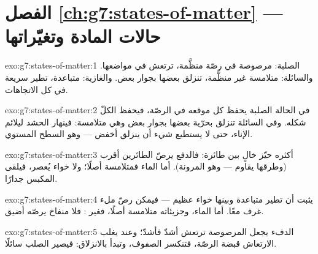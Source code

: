 \section*{الفصل \ref{ch:g7:states-of-matter} --- حالات المادة وتغيّراتها}

\begin{solution}{exo:g7:states-of-matter:1}
الصلبة:  مرصوصة في رصّة منظَّمة، ترتعش في مواضعها.
والسائلة:  متلامسة غير منظَّمة، تنزلق بعضها بجوار بعض.
والغازية:  متباعدة، تطير سريعة في كل الاتجاهات.
\end{solution}

\begin{solution}{exo:g7:states-of-matter:2}
في الحالة الصلبة يحفظ كل  موقعه في الرصّة، فيحفظ الكلّ
شكله. وفي السائلة تنزلق  بحرّية بعضها بجوار بعض وهي
متلامسة: فينهار الحشد ليلائم الإناء، حتى لا يستطيع شيء أن
ينزلق أخفض --- وهو السطح المستوي.
\end{solution}

\begin{solution}{exo:g7:states-of-matter:3}
 أكثره حيّز خالٍ بين  طائرة: فالدفع يرصّ الطائرين
أقرب (وطرقها يقاوم --- وهو المرونة). أما  الماء فمتلامسة
أصلًا؛ ولا خواء يُعصر، فيلقى المكبس جدارًا.
\end{solution}

\begin{solution}{exo:g7:states-of-matter:4}
يثبت أن   تطير متباعدة وبينها خواء عظيم --- فيمكن
رصّ ملء غرف معًا. أما الماء، وجزيئاته متلامسة أصلًا، فغير : فلا منفاخ يرصّه أضيق.
\end{solution}

\begin{solution}{exo:g7:states-of-matter:5}
الدفء يجعل  المرصوصة ترتعش أشدّ فأشدّ؛ وعند  يغلب الارتعاش قبضة الرصّة، فتنكسر الصفوف، وتبدأ
 بالانزلاق: فيصير الصلب سائلًا.
\end{solution}


